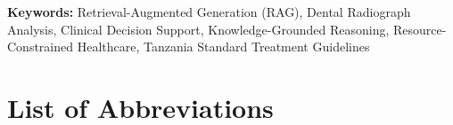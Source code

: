\documentclass[12pt,a4paper]{report}
\begin{document}
	\vspace{1em}
	\noindent \textbf{Keywords:} Retrieval-Augmented Generation (RAG), Dental Radiograph Analysis, Clinical Decision Support,
	Knowledge-Grounded Reasoning, Resource-Constrained Healthcare, Tanzania
	Standard Treatment Guidelines
	
	\clearpage
	\tableofcontents
	\clearpage
	\listoffigures
	\clearpage
	\listoftables


	
	\clearpage
	\chapter*{List of Abbreviations}
	
\end{document}
